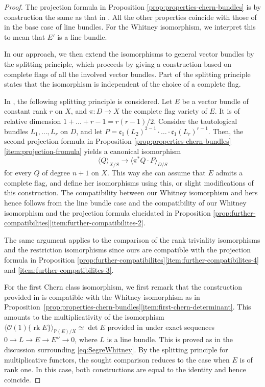 \documentclass[11pt]{article}
\theoremstyle{plain}
\theoremstyle{definition}
\newcommand{\PBbb}{\mathbb P}
\newcommand{\Ocal}{\mathcal O}
\newcommand{\cfrak}{\mathfrak c}
\DeclareMathOperator{\rk}{rk}
\begin{document}
\begin{proof}
The projection formula in Proposition \ref{prop:properties-chern-bundles} is by construction the same as that in \cite{Elkikfib}. All the other properties coincide with those of \cite{Elkikfib} in the base case of line bundles. For the Whitney isomorphism, we interpret this to mean that $E'$ is a line bundle.

In our approach, we then extend the isomorphisms to general vector bundles by the splitting principle, which proceeds by giving a construction based on complete flags of all the involved vector bundles. Part of the splitting principle states that the isomorphism is independent of the choice of a complete flag.

In \cite[\textsection V.2.3]{Elkikfib}, the following splitting principle is considered. Let $E$ be a vector bundle of constant rank $r$ on $X$, and $\pi\colon D \to X$ the complete flag variety of $E$. It is of relative dimension $1 + \ldots + r-1 = r(r-1)/2$. Consider the tautological bundles $L_1, \ldots, L_{r}$ on $D$, and let $P = \cfrak_1(L_2)^{2-1}\cdot \ldots\cdot \cfrak_1(L_r)^{r-1}$. Then, the second projection formula in Proposition \ref{prop:properties-chern-bundles}\eqref{item:projection-fromula} yields a canonical isomorphism
\begin{displaymath}
\langle Q\rangle_{X/S} \to \langle\pi^{\ast} Q\cdot P\rangle_{D/S}
\end{displaymath}
for every $Q$ of degree $n+1$ on $X$. This way she can assume that $E$ admits a complete flag, and define her isomorphisms using this, or slight modifications of this construction. The compatibility between our Whitney isomorphism and hers hence follows from the line bundle case and the compatibility of our Whitney isomorphism and the projection formula elucidated in Proposition \ref{prop:further-compatibilites}\eqref{item:further-compatibilites-2}.

The same argument applies to the comparison of the rank triviality isomorphisms and the restriction isomorphisms since ours are compatible with the projection formula in Proposition \ref{prop:further-compatibilites}\eqref{item:further-compatibilites-4} and \eqref{item:further-compatibilites-3}.

For the first Chern class isomorphism, we first remark that the construction provided in \cite[\textsection V.1.2 (e)]{Elkikfib} is compatible with the Whitney isomorphism as in Proposition~\ref{prop:properties-chern-bundles}\eqref{item:first-chern-determinant}. This amounts to the multiplicativity of the isomorphism $\langle \Ocal(1)\{\rk E\} \rangle_{\PBbb(E)/X} \simeq \det E$ provided in \cite[Prop.\,IV.3]{Elkikfib} under exact sequences $0 \to L \to E \to E'' \to 0$, where $L$ is a line bundle. This is proved as in the discussion surrounding \eqref{eq:SegreWhitney}. By the splitting principle for multiplicative functors, the sought comparison reduces to the case when $E$ is of rank one. In this case, both constructions are equal to the identity and hence coincide.


\end{proof}
\end{document}

